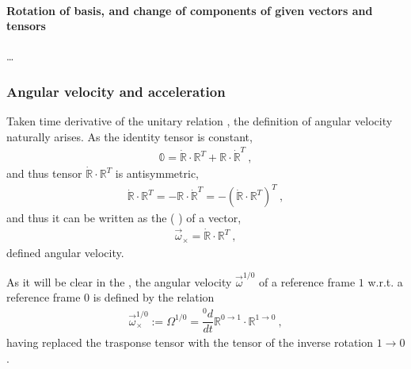 \documentclass[letterpaper,10pt,english]{jupyterBook}
\begin{document}
\paragraph{Rotation of basis, and change of components of given vectors and tensors}
\label{\detokenize{ch/kinematics-rotations-tensors:rotation-of-basis-and-change-of-components-of-given-vectors-and-tensors}}
\sphinxAtStartPar
…


\subsubsection{Angular velocity and acceleration}
\label{\detokenize{ch/kinematics-rotations-tensors:angular-velocity-and-acceleration}}
\sphinxAtStartPar
{} Taken time derivative of the unitary relation  , the definition of angular velocity naturally arises. As the identity tensor is constant,
\begin{equation*}
\begin{split}\mathbb{0} = \dot{\mathbb{R}} \cdot \mathbb{R}^T + \mathbb{R} \cdot \dot{\mathbb{R}}^T \ ,\end{split}
\end{equation*}
\sphinxAtStartPar
and thus tensor \(\dot{\mathbb{R}} \cdot \mathbb{R}^T\) is anti\sphinxhyphen{}symmetric,
\begin{equation*}
\begin{split}\dot{\mathbb{R}} \cdot \mathbb{R}^T = - \mathbb{R} \cdot \dot{\mathbb{R}}^T = - \left( \dot{\mathbb{R}} \cdot \mathbb{R}^T \right)^T \ ,\end{split}
\end{equation*}
\sphinxAtStartPar
and thus it can be written as the  ( ) of a vector,
\begin{equation*}
\begin{split}\vec{\omega}_{\times} = \dot{\mathbb{R}} \cdot \mathbb{R}^T \ ,\end{split}
\end{equation*}
\sphinxAtStartPar
defined angular velocity.

\sphinxAtStartPar
As it will be clear in the {\hyperref[\detokenize{ch/kinematics-rotations-tensors:classical-mechanics-kinematics-rotations-tensor-successive}]{}}, the angular velocity \(\vec{\omega}^{1/0}\) of a reference frame \(1\) w.r.t. a reference frame \(0\) is defined by the relation
\begin{equation*}
\begin{split}\vec{\omega}^{1/0}_{\times} := \mathbb{\Omega}^{1/0} = \dfrac{{}^0 d }{d t}\mathbb{R}^{0\rightarrow 1} \cdot \mathbb{R}^{1 \rightarrow 0} \ ,\end{split}
\end{equation*}
\sphinxAtStartPar
having replaced the trasponse tensor with the tensor of the inverse rotation \(1 \rightarrow 0\).
\end{document}
